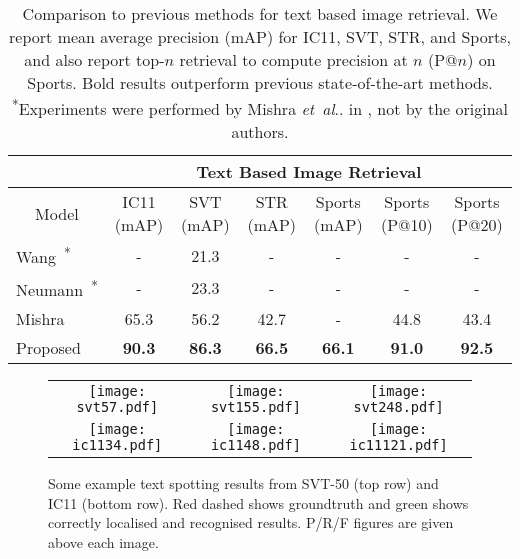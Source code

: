 \documentclass[twocolumn]{svjour3}          \smartqed  \usepackage{epsfig}
\makeatletter
\DeclareRobustCommand\onedot{\futurelet\@let@token\@onedot}
\def\@onedot{\ifx\@let@token.\else.\null\fi\xspace}
\def\etal{\emph{et~al}\onedot}
\makeatother
\begin{document}
\setlength{\tabcolsep}{3pt}
\begin{table*}[t]
\begin{center}
\begin{tabular}[t]{|l||c|c|c|c|c|c|}
\cline{2-7} 
\multicolumn{1}{c|}{\centering ~} & 
\multicolumn{6}{|c|}{\bf Text Based Image Retrieval}\\
\hline
\multicolumn{1}{|c||}{\centering Model} & 
\multicolumn{1}{c|}{\centering IC11 (mAP)} &
\multicolumn{1}{c|}{\centering SVT (mAP)} &
\multicolumn{1}{c|}{\centering STR (mAP)} &
\multicolumn{1}{c|}{\centering Sports (mAP)} &
\multicolumn{1}{c|}{\centering Sports (P@10)}&
\multicolumn{1}{c|}{\centering Sports (P@20)}\\
\hline\hline
Wang~\cite{Wang11}\textsuperscript{*}  & - & 21.3 & - & - & - & -\\
\rowcolor{Gray}
Neumann~\cite{Neumann12}\textsuperscript{*}  & - & 23.3 & - & - & - & -\\
Mishra~\cite{Mishra13}  & 65.3 & 56.2 & 42.7 & - & 44.8 & 43.4\\
\hline
\rowcolor{Gray}
Proposed  & \bf 90.3 & \bf 86.3 & \bf 66.5 & \bf 66.1 & \bf 91.0 & \bf 92.5\\
\hline
\end{tabular}
\end{center}
\vspace*{-1em}
\caption{\small Comparison to previous methods for text based image retrieval. We report mean average precision (mAP) for IC11, SVT, STR, and Sports, and also report top-$n$ retrieval to compute precision at $n$ (P@$n$) on Sports. Bold results outperform previous state-of-the-art methods. \textsuperscript{*}Experiments were performed by Mishra \etal in \cite{Mishra13}, not by the original authors.}
\label{table:retrieval}
\end{table*}

\begin{figure*}
\begin{center}
\begin{tabular}{ccc}
\texttt{[image: svt57.pdf]}&
\texttt{[image: svt155.pdf]}&
\texttt{[image: svt248.pdf]}\\
\texttt{[image: ic1134.pdf]}&
\texttt{[image: ic1148.pdf]}&
\texttt{[image: ic11121.pdf]}\\
\end{tabular}
\caption{Some example text spotting results from SVT-50 (top row) and IC11 (bottom row). Red dashed shows groundtruth and green shows correctly localised and recognised results. P/R/F figures are given above each image.}
\label{fig:examples}
\end{center}
\end{figure*}
\end{document}
